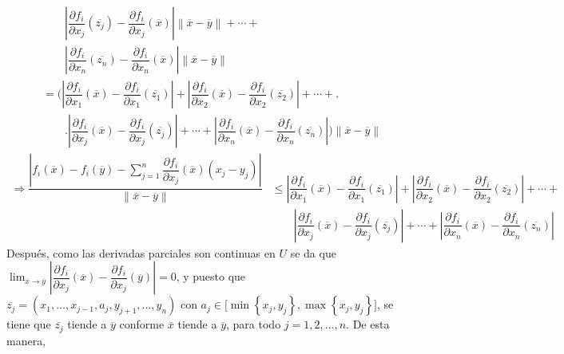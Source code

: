 \documentclass[fleqn]{article}
\begin{document}
\begin{equation*}
\begin{split}
            & \qquad \left\lvert \dfrac{\partial f_i}{\partial x_j} (\overline{z_j}) - \dfrac{\partial f_i}{\partial x_j} (\overline{x}) \right\rvert \left\lVert \overline{x} - \overline{y} \right\rVert + \cdots + \\
            & \qquad \left\lvert \dfrac{\partial f_i}{\partial x_n} (\overline{z_n}) - \dfrac{\partial f_i}{\partial x_n} (\overline{x}) \right\rvert \left\lVert \overline{x} - \overline{y} \right\rVert \\
            &= \Biggl( \left\lvert \dfrac{\partial f_i}{\partial x_1} (\overline{x}) - \dfrac{\partial f_i}{\partial x_1} (\overline{z_1}) \right\rvert + \left\lvert \dfrac{\partial f_i}{\partial x_2} (\overline{x}) - \dfrac{\partial f_i}{\partial x_2} (\overline{z_2}) \right\rvert + \cdots + \Biggr. \\
            & \qquad \Biggl. \left\lvert \dfrac{\partial f_i}{\partial x_j} (\overline{x}) - \dfrac{\partial f_i}{\partial x_j} (\overline{z_j}) \right\rvert + \cdots + \left\lvert \dfrac{\partial f_i}{\partial x_n} (\overline{x}) - \dfrac{\partial f_i}{\partial x_n} (\overline{z_n}) \right\rvert \Biggr) \left\lVert \overline{x} - \overline{y} \right\rVert
        \end{split}
    \end{equation*}
    \begin{equation*}
        \begin{split}
            \Longrightarrow \dfrac{\left\lvert f_i(\overline{x}) - f_i(\overline{y}) - \displaystyle \sum_{j=1}^{n} \dfrac{\partial f_i}{\partial x_j}(\overline{x}) \left( x_j - y_j \right) \right\rvert}{\left\lVert \overline{x} - \overline{y} \right\rVert} &\leq \left\lvert \dfrac{\partial f_i}{\partial x_1} (\overline{x}) - \dfrac{\partial f_i}{\partial x_1} (\overline{z_1}) \right\rvert + \left\lvert \dfrac{\partial f_i}{\partial x_2} (\overline{x}) - \dfrac{\partial f_i}{\partial x_2} (\overline{z_2}) \right\rvert + \cdots + \\
            & \qquad \left\lvert \dfrac{\partial f_i}{\partial x_j} (\overline{x}) - \dfrac{\partial f_i}{\partial x_j} (\overline{z_j}) \right\rvert + \cdots + \left\lvert \dfrac{\partial f_i}{\partial x_n} (\overline{x}) - \dfrac{\partial f_i}{\partial x_n} (\overline{z_n}) \right\rvert
        \end{split}
    \end{equation*}
    Después, como las derivadas parciales son continuas en $ U $ se da que $ \displaystyle \lim_{\overline{x} \to \overline{y}} \left\lvert \dfrac{\partial f_i}{\partial x_j} (\overline{x}) - \dfrac{\partial f_i}{\partial x_j} (\overline{y}) \right\rvert = 0 $, y puesto que $ \overline{z_j} = (x_1, \ldots, x_{j-1}, a_j, y_{j+1}, \ldots, y_n) $ con $ a_j \in \bigl[ \min \left\lbrace x_j, y_j \right\rbrace, \max \left\lbrace x_j, y_j \right\rbrace \bigr] $, se tiene que $ \overline{z_j} $ tiende a $ \overline{y} $ conforme $ \overline{x} $ tiende a $ \overline{y} $, para todo $ j = 1, 2, \ldots, n $. De esta manera, 
\end{document}
